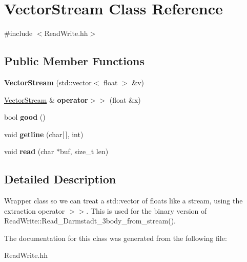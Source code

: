 \hypertarget{classVectorStream}{}\section{Vector\+Stream Class Reference}
\label{classVectorStream}


{\ttfamily \#include $<$Read\+Write.\+hh$>$}

\subsection*{Public Member Functions}
\begin{DoxyCompactItemize}
\item 
\mbox{\label{classVectorStream_a695674b148ae15db7422e6590aaa5408}} 
{\bfseries Vector\+Stream} (std\+::vector$<$ float $>$ \&v)
\item 
\mbox{\label{classVectorStream_abc2e33c288f1cfa79eaea59ac98d3572}} 
\hyperlink{classVectorStream}{Vector\+Stream} \& {\bfseries operator$>$$>$} (float \&x)
\item 
\mbox{\label{classVectorStream_aaba8ff30d1e9af1d7e049ff2a02936f3}} 
bool {\bfseries good} ()
\item 
\mbox{\label{classVectorStream_a86d57229be3427661e8506c2accfcbc7}} 
void {\bfseries getline} (char\mbox{[}$\,$\mbox{]}, int)
\item 
\mbox{\label{classVectorStream_ab0a29d62e16e204aaf4390015a7b0978}} 
void {\bfseries read} (char $\ast$buf, size\+\_\+t len)
\end{DoxyCompactItemize}


\subsection{Detailed Description}
Wrapper class so we can treat a std\+::vector of floats like a stream, using the extraction operator $>$$>$. This is used for the binary version of Read\+Write\+::\+Read\+\_\+\+Darmstadt\+\_\+3body\+\_\+from\+\_\+stream(). 

The documentation for this class was generated from the following file\+:\begin{DoxyCompactItemize}
\item 
Read\+Write.\+hh\end{DoxyCompactItemize}
